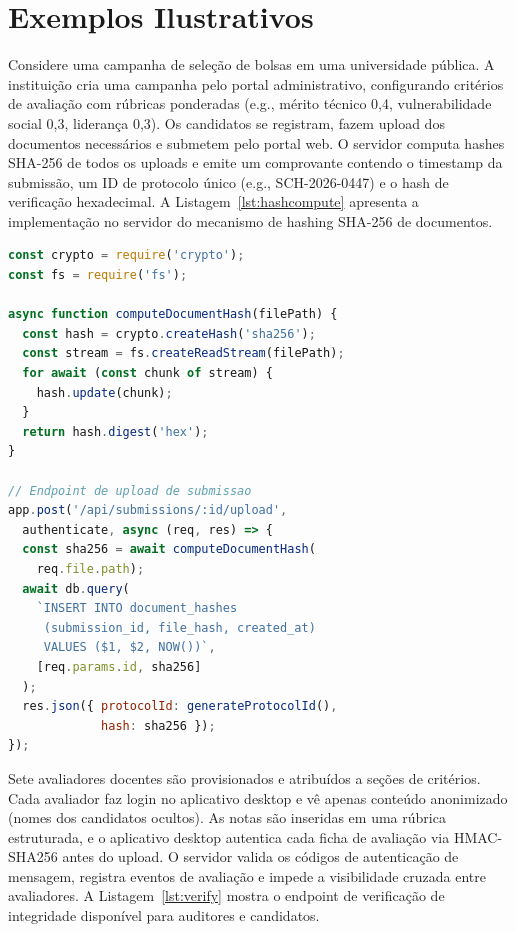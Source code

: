 \documentclass[preprint,12pt,a4paper]{elsarticle}
\begin{document}
\section{Exemplos Ilustrativos}

Considere uma campanha de seleção de bolsas em uma universidade pública. A instituição cria uma campanha pelo portal administrativo, configurando critérios de avaliação com rúbricas ponderadas (e.g., mérito técnico 0,4, vulnerabilidade social 0,3, liderança 0,3). Os candidatos se registram, fazem upload dos documentos necessários e submetem pelo portal web. O servidor computa hashes SHA-256 de todos os uploads e emite um comprovante contendo o timestamp da submissão, um ID de protocolo único (e.g., SCH-2026-0447) e o hash de verificação hexadecimal. A Listagem~\ref{lst:hashcompute} apresenta a implementação no servidor do mecanismo de hashing SHA-256 de documentos.

\begin{lstlisting}[language=JavaScript, caption={Computação de hash SHA-256 no servidor durante o upload de documento. O hash é armazenado no banco de dados e retornado ao candidato como comprovante de verificação.}, label=lst:hashcompute]
const crypto = require('crypto');
const fs = require('fs');

async function computeDocumentHash(filePath) {
  const hash = crypto.createHash('sha256');
  const stream = fs.createReadStream(filePath);
  for await (const chunk of stream) {
    hash.update(chunk);
  }
  return hash.digest('hex');
}

// Endpoint de upload de submissao
app.post('/api/submissions/:id/upload',
  authenticate, async (req, res) => {
  const sha256 = await computeDocumentHash(
    req.file.path);
  await db.query(
    `INSERT INTO document_hashes
     (submission_id, file_hash, created_at)
     VALUES ($1, $2, NOW())`,
    [req.params.id, sha256]
  );
  res.json({ protocolId: generateProtocolId(),
             hash: sha256 });
});
\end{lstlisting}

Sete avaliadores docentes são provisionados e atribuídos a seções de critérios. Cada avaliador faz login no aplicativo desktop e vê apenas conteúdo anonimizado (nomes dos candidatos ocultos). As notas são inseridas em uma rúbrica estruturada, e o aplicativo desktop autentica cada ficha de avaliação via HMAC-SHA256 antes do upload. O servidor valida os códigos de autenticação de mensagem, registra eventos de avaliação e impede a visibilidade cruzada entre avaliadores. A Listagem~\ref{lst:verify} mostra o endpoint de verificação de integridade disponível para auditores e candidatos.
\end{document}

